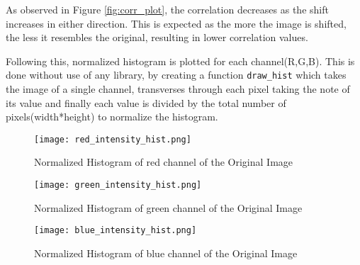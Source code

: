 \begin{tcolorbox}[breakable]
\begin{sol}
		As observed in Figure \ref{fig:corr_plot}, the correlation
		decreases as the shift increases in either direction. This is
		expected as the more the image is shifted, the less it
		resembles the original, resulting in lower correlation values.

		Following this, normalized histogram is plotted for each channel(R,G,B). This is done without use of any library, by creating a function \texttt{draw\_hist} which takes the image of a single channel, transverses through each pixel taking the note of its value and finally each value is divided by the total number of pixels(width*height) to normalize the histogram.

		\begin{figure}[H]
			\centering
			\texttt{[image: red\_intensity\_hist.png]}
			\caption{Normalized Histogram of red channel of the Original Image}
			\label{fig:hist_red_plot}
		\end{figure}
		\begin{figure}[H]
			\centering
			\texttt{[image: green\_intensity\_hist.png]}
			\caption{Normalized Histogram of green channel of the Original Image}
			\label{fig:hist_green_plot}
		\end{figure}
		\begin{figure}[H]
			\centering
			\texttt{[image: blue\_intensity\_hist.png]}
			\caption{Normalized Histogram of blue channel of the Original Image}
			\label{fig:hist_blue_plot}
		\end{figure}

		

		
	\end{sol}
\end{tcolorbox}
